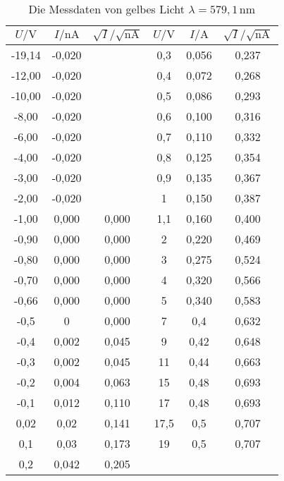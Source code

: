   \begin{table}[H]
    \centering
    \caption{Die Messdaten von gelbes Licht $\lambda = 579,1 \,\text{nm}$ }
    \label{tab:gelb}
    \begin{tabular}{| c | c |c||c|c|c| }
    \toprule
    $U/\mathrm{V}$ &$I/\mathrm{nA}$  &  $\sqrt{I}/\sqrt{\mathrm{nA}}$&$U/\mathrm{V}$ & $I/\mathrm{A} $& $\sqrt{I}/\sqrt{\mathrm{nA}}$  \\
    \midrule 
    -19,14	& -0,020	&	        &  0,3	   &   0,056	& 0,237   \\
    -12,00	& -0,020	&	        &  0,4	   &   0,072	& 0,268   \\
    -10,00	& -0,020	&	        &  0,5	   &   0,086	& 0,293   \\
    -8,00	  & -0,020	&	        &  0,6	   &   0,100	& 0,316   \\
    -6,00	  & -0,020	&	        &  0,7	   &   0,110	& 0,332   \\
    -4,00	  & -0,020	&	        &  0,8	   &   0,125	& 0,354   \\
    -3,00	  & -0,020	&	        &  0,9	   &   0,135	& 0,367   \\
    -2,00	  & -0,020	&	        &  1	     &   0,150	& 0,387   \\
    -1,00	  & 0,000	  & 0,000	  &  1,1	   &   0,160	& 0,400   \\
    -0,90	  & 0,000	  & 0,000	  &  2	     &   0,220	& 0,469   \\
    -0,80	  & 0,000	  & 0,000	  &  3	     &   0,275	& 0,524   \\
    -0,70	  & 0,000	  & 0,000	  &  4	     &   0,320	& 0,566   \\
    -0,66	  & 0,000	  & 0,000	  &  5	     &   0,340	& 0,583   \\
    -0,5	  & 0    	  & 0,000	  &  7	     &   0,4	  & 0,632   \\
    -0,4	  & 0,002	  & 0,045	  &  9	     &   0,42	  & 0,648   \\
    -0,3	  & 0,002	  & 0,045	  &  11	     &   0,44	  & 0,663   \\
    -0,2	  & 0,004	  & 0,063	  &  15	     &   0,48	  & 0,693   \\
    -0,1	  & 0,012	  & 0,110	  &  17	     &   0,48	  & 0,693   \\
    0,02	  & 0,02	  & 0,141	  &  17,5    &   0,5	  & 0,707   \\
    0,1	    & 0,03	  & 0,173	  &  19	     &   0,5	  & 0,707   \\
    0,2	    & 0,042	  & 0,205	  &  		     &          &         \\ 
    
    
    \bottomrule
    \end{tabular}
  \end{table}
  \noindent

